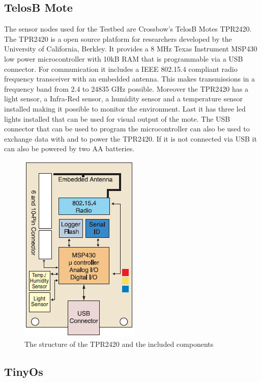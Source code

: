 \subsection{TelosB Mote}
The sensor nodes used for the Testbed are Crossbow's TelosB Motes TPR2420. The TPR2420 is a open source platform for researchers developed by the University of California, Berkley. It provides a 8 MHz Texas Instrument MSP430 low power microcontroller with 10kB RAM that is programmable via a USB connector. For communication it includes a IEEE 802.15.4 compliant radio frequency transceiver with an embedded antenna. This makes transmissions in a frequency band from 2.4 to 24835 GHz possible. Moreover the TPR2420 has a light sensor, a Infra-Red sensor, a humidity sensor and a temperature sensor installed making it possible to monitor the environment. Last it has three led lights installed that can be used for visual output of the mote. The USB connector that can be used to program the microcontroller can also be used to exchange data with and to power the TPR2420. If it is not connected via USB it can also be powered by two AA batteries. \cite{telosb}

\begin{figure}[htbp]
	\centering
    \includegraphics[scale=0.7]{content/images/Mote1}
   	\caption{The structure of the TPR2420 and the included components \cite{telosb}}
    \label{fig:telosb}
\end{figure}
 
\subsection{TinyOs}




